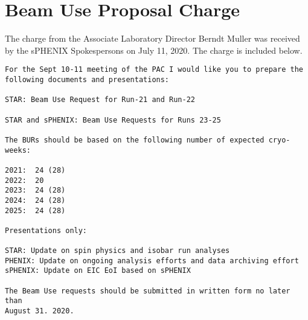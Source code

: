 \chapter{Beam Use Proposal Charge}
\label{chap:charge}

The charge from the Associate Laboratory Director Berndt Muller was received by the sPHENIX Spokespersons on July 11, 2020.   The charge is included below.

\begin{verbatim}
For the Sept 10-11 meeting of the PAC I would like you to prepare the 
following documents and presentations:

STAR: Beam Use Request for Run-21 and Run-22

STAR and sPHENIX: Beam Use Requests for Runs 23-25

The BURs should be based on the following number of expected cryo-weeks:

2021:  24 (28)
2022:  20
2023:  24 (28)
2024:  24 (28)
2025:  24 (28)

Presentations only:

STAR: Update on spin physics and isobar run analyses
PHENIX: Update on ongoing analysis efforts and data archiving effort
sPHENIX: Update on EIC EoI based on sPHENIX

The Beam Use requests should be submitted in written form no later than 
August 31. 2020.
\end{verbatim}